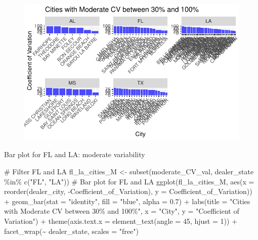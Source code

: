 \documentclass[
  letterpaper,
  DIV=11,
  numbers=noendperiod]{scrartcl}
\newenvironment{Shaded}{\begin{snugshade}}{\end{snugshade}}
\newcommand{\AttributeTok}[1]{\textcolor[rgb]{0.40,0.45,0.13}{#1}}
\newcommand{\CommentTok}[1]{\textcolor[rgb]{0.37,0.37,0.37}{#1}}
\newcommand{\DecValTok}[1]{\textcolor[rgb]{0.68,0.00,0.00}{#1}}
\newcommand{\FloatTok}[1]{\textcolor[rgb]{0.68,0.00,0.00}{#1}}
\newcommand{\FunctionTok}[1]{\textcolor[rgb]{0.28,0.35,0.67}{#1}}
\newcommand{\NormalTok}[1]{\textcolor[rgb]{0.00,0.23,0.31}{#1}}
\newcommand{\OtherTok}[1]{\textcolor[rgb]{0.00,0.23,0.31}{#1}}
\newcommand{\SpecialCharTok}[1]{\textcolor[rgb]{0.37,0.37,0.37}{#1}}
\newcommand{\StringTok}[1]{\textcolor[rgb]{0.13,0.47,0.30}{#1}}
\begin{document}
\begin{figure}[H]

{\centering \includegraphics{CV_Communities2_files/figure-pdf/unnamed-chunk-11-1.pdf}

}

\end{figure}

Bar plot for FL and LA: moderate variability

\begin{Shaded}
\begin{Highlighting}[]
\CommentTok{\# Filter FL and LA}
\NormalTok{fl\_la\_cities\_M }\OtherTok{\textless{}{-}} \FunctionTok{subset}\NormalTok{(moderate\_CV\_val, dealer\_state }\SpecialCharTok{\%in\%} \FunctionTok{c}\NormalTok{(}\StringTok{"FL"}\NormalTok{, }\StringTok{"LA"}\NormalTok{))}
\CommentTok{\# Bar plot for FL and LA}
\FunctionTok{ggplot}\NormalTok{(fl\_la\_cities\_M, }\FunctionTok{aes}\NormalTok{(}\AttributeTok{x =} \FunctionTok{reorder}\NormalTok{(dealer\_city, }\SpecialCharTok{{-}}\NormalTok{Coefficient\_of\_Variation), }\AttributeTok{y =}\NormalTok{ Coefficient\_of\_Variation)) }\SpecialCharTok{+}
  \FunctionTok{geom\_bar}\NormalTok{(}\AttributeTok{stat =} \StringTok{"identity"}\NormalTok{, }\AttributeTok{fill =} \StringTok{"blue"}\NormalTok{, }\AttributeTok{alpha =} \FloatTok{0.7}\NormalTok{) }\SpecialCharTok{+}
  \FunctionTok{labs}\NormalTok{(}\AttributeTok{title =} \StringTok{"Cities with  Moderate CV between 30\% and 100\%"}\NormalTok{, }\AttributeTok{x =} \StringTok{"City"}\NormalTok{, }\AttributeTok{y =} \StringTok{"Coefficient of Variation"}\NormalTok{) }\SpecialCharTok{+}
  \FunctionTok{theme}\NormalTok{(}\AttributeTok{axis.text.x =} \FunctionTok{element\_text}\NormalTok{(}\AttributeTok{angle =} \DecValTok{45}\NormalTok{, }\AttributeTok{hjust =} \DecValTok{1}\NormalTok{)) }\SpecialCharTok{+}
  \FunctionTok{facet\_wrap}\NormalTok{(}\SpecialCharTok{\textasciitilde{}}\NormalTok{ dealer\_state, }\AttributeTok{scales =} \StringTok{"free"}\NormalTok{)}
\end{Highlighting}
\end{Shaded}
\end{document}
